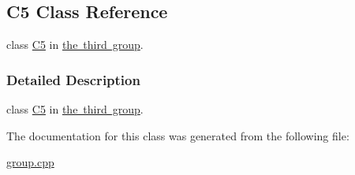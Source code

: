 \hypertarget{class_c5}{}\subsection{C5 Class Reference}
\label{class_c5}


class \mbox{\hyperlink{class_c5}{C5}} in \mbox{\hyperlink{group__group3}{the third group}}.  




\subsubsection{Detailed Description}
class \mbox{\hyperlink{class_c5}{C5}} in \mbox{\hyperlink{group__group3}{the third group}}. 

The documentation for this class was generated from the following file\+:\begin{DoxyCompactItemize}
\item 
\mbox{\hyperlink{group_8cpp}{group.\+cpp}}\end{DoxyCompactItemize}
